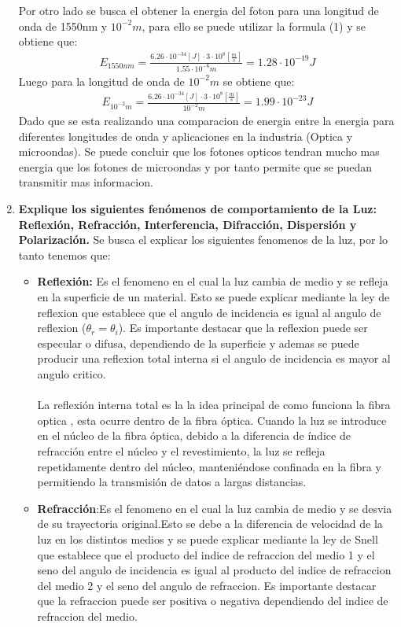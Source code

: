 \begin{enumerate}
Por otro lado se busca el obtener la energia del foton para una longitud de onda de 1550nm y $10^{-2}m$, para ello se puede utilizar la formula (1) y se obtiene que:
\begin{align}
	E_{1550nm} = \frac{6.26 \cdot 10^{-34} [J] \cdot 3 \cdot 10^{8}[\frac{m}{s}]}{1.55\cdot 10^{-6}m} = 1.28 \cdot 10^{-19} J
\end{align}
Luego para la longitud de onda de $10^{-2}m$ se obtiene que:
\begin{align}
	E_{10^{-2}m} = \frac{6.26 \cdot 10^{-34} [J] \cdot 3 \cdot 10^{8}[\frac{m}{s}]}{10^{-2}m} = 1.99 \cdot 10^{-23} J
\end{align}
Dado que se esta realizando una comparacion de energia entre la energia para diferentes longitudes de onda y aplicaciones en la industria (Optica y microondas). Se puede concluir que los fotones opticos tendran mucho mas energia que los fotones de microondas y por tanto permite que se puedan transmitir mas informacion.
\item \textbf{Explique los siguientes fenómenos de comportamiento de la Luz: Reflexión,
Refracción, Interferencia, Difracción, Dispersión y Polarización.}
Se busca el explicar los siguientes fenomenos de la luz, por lo tanto tenemos que:
\begin{itemize}
	\item \textbf{Reflexión:} Es el fenomeno en el cual la luz cambia de medio y se refleja en la superficie de un material. Esto se puede explicar mediante la ley de reflexion que establece que el angulo de incidencia es igual al angulo de reflexion ($\theta_{r} = \theta_{i}$). Es importante destacar que la reflexion puede ser especular o difusa, dependiendo de la superficie y ademas se puede producir una reflexion total interna si el angulo de incidencia es mayor al angulo critico.\\\\
	La reflexión interna total es la la idea principal de como funciona la fibra optica , esta ocurre dentro de la fibra óptica. Cuando la luz se introduce en el núcleo de la fibra óptica, debido a la diferencia de índice de refracción entre el núcleo y el revestimiento, la luz se refleja repetidamente dentro del núcleo, manteniéndose confinada en la fibra y permitiendo la transmisión de datos a largas distancias.
	\item \textbf{Refracción}:Es el fenomeno en el cual la luz cambia de medio y se desvia de su trayectoria original.Esto se debe a la diferencia de velocidad de la luz en los distintos medios y se puede explicar mediante la ley de Snell que establece que el producto del indice de refraccion del medio 1 y el seno del angulo de incidencia es igual al producto del indice de refraccion del medio 2 y el seno del angulo de refraccion. Es importante destacar que la refraccion puede ser positiva o negativa dependiendo del indice de refraccion del medio.\\\\

\end{itemize}
\end{enumerate}
